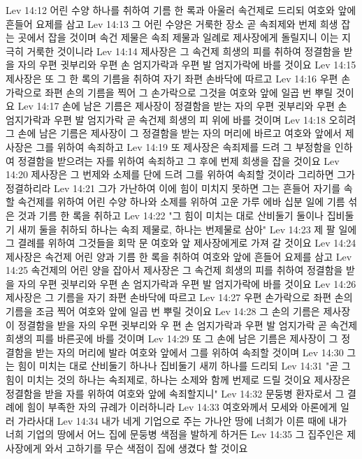 Lev 14:12  어린 수양 하나를 취하여 기름 한 록과 아울러 속건제로 드리되 여호와 앞에 흔들어 요제를 삼고
Lev 14:13  그 어린 수양은 거룩한 장소 곧 속죄제와 번제 희생 잡는 곳에서 잡을 것이며 속건 제물은 속죄 제물과 일례로 제사장에게 돌릴지니 이는 지극히 거룩한 것이니라
Lev 14:14  제사장은 그 속건제 희생의 피를 취하여 정결함을 받을 자의 우편 귓부리와 우편 손 엄지가락과 우편 발 엄지가락에 바를 것이요
Lev 14:15  제사장은 또 그 한 록의 기름을 취하여 자기 좌편 손바닥에 따르고
Lev 14:16  우편 손가락으로 좌편 손의 기름을 찍어 그 손가락으로 그것을 여호와 앞에 일곱 번 뿌릴 것이요
Lev 14:17  손에 남은 기름은 제사장이 정결함을 받는 자의 우편 귓부리와 우편 손 엄지가락과 우편 발 엄지가락 곧 속건제 희생의 피 위에 바를 것이며
Lev 14:18  오히려 그 손에 남은 기름은 제사장이 그 정결함을 받는 자의 머리에 바르고 여호와 앞에서 제사장은 그를 위하여 속죄하고
Lev 14:19  또 제사장은 속죄제를 드려 그 부정함을 인하여 정결함을 받으려는 자를 위하여 속죄하고 그 후에 번제 희생을 잡을 것이요
Lev 14:20  제사장은 그 번제와 소제를 단에 드려 그를 위하여 속죄할 것이라 그리하면 그가 정결하리라
Lev 14:21  그가 가난하여 이에 힘이 미치지 못하면 그는 흔들어 자기를 속할 속건제를 위하여 어린 수양 하나와 소제를 위하여 고운 가루 에바 십분 일에 기름 섞은 것과 기름 한 록을 취하고
Lev 14:22  "그 힘이 미치는 대로 산비둘기 둘이나 집비둘기 새끼 둘을 취하되 하나는 속죄 제물로, 하나는 번제물로 삼아"
Lev 14:23  제 팔 일에 그 결례를 위하여 그것들을 회막 문 여호와 앞 제사장에게로 가져 갈 것이요
Lev 14:24  제사장은 속건제 어린 양과 기름 한 록을 취하여 여호와 앞에 흔들어 요제를 삼고
Lev 14:25  속건제의 어린 양을 잡아서 제사장은 그 속건제 희생의 피를 취하여 정결함을 받을 자의 우편 귓부리와 우편 손 엄지가락과 우편 발 엄지가락에 바를 것이요
Lev 14:26  제사장은 그 기름을 자기 좌편 손바닥에 따르고
Lev 14:27  우편 손가락으로 좌편 손의 기름을 조금 찍어 여호와 앞에 일곱 번 뿌릴 것이요
Lev 14:28  그 손의 기름은 제사장이 정결함을 받을 자의 우편 귓부리와 우 편 손 엄지가락과 우편 발 엄지가락 곧 속건제 희생의 피를 바른곳에 바를 것이며
Lev 14:29  또 그 손에 남은 기름은 제사장이 그 정결함을 받는 자의 머리에 발라 여호와 앞에서 그를 위하여 속죄할 것이며
Lev 14:30  그는 힘이 미치는 대로 산비둘기 하나나 집비둘기 새끼 하나를 드리되
Lev 14:31  "곧 그 힘이 미치는 것의 하나는 속죄제로, 하나는 소제와 함께 번제로 드릴 것이요 제사장은 정결함을 받을 자를 위하여 여호와 앞에 속죄할지니"
Lev 14:32  문둥병 환자로서 그 결례에 힘이 부족한 자의 규례가 이러하니라
Lev 14:33  여호와께서 모세와 아론에게 일러 가라사대
Lev 14:34  내가 네게 기업으로 주는 가나안 땅에 너희가 이른 때에 내가 너희 기업의 땅에서 어느 집에 문둥병 색점을 발하게 하거든
Lev 14:35  그 집주인은 제사장에게 와서 고하기를 무슨 색점이 집에 생겼다 할 것이요

